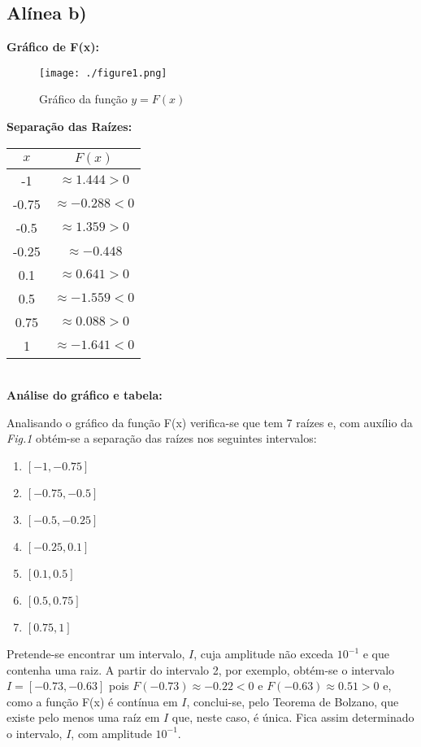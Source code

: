 \documentclass{article}
\begin{document}
\subsection*{Alínea b)}
\textbf{Gráfico de F(x):}\\
\begin{minipage}{0.6\textwidth}
\begin{figure}[H]
\texttt{[image: ./figure1.png]}
\caption{Gráfico da função $y=F(x)$}
\end{figure}
\end{minipage}
\begin{minipage}{0.3\textwidth}
\textbf{Separação das Raízes:}\\[5mm]
\begin{tabular}{c|c}
    $ x $ & $F(x)$\\
    \hline
    -1  & $ \approx 1.444>0 $\\
    -0.75 & $\approx-0.288<0$\\
    -0.5 & $\approx1.359>0$\\
    -0.25 & $\approx-0.448$\\
    0.1 & $\approx0.641>0$\\
    0.5 & $\approx-1.559<0$ \\
    0.75 & $\approx0.088>0$\\
    1 & $\approx-1.641<0 $\\
\end{tabular}
\end{minipage}\\[5mm]
\textbf{Análise do gráfico e tabela:}\par
Analisando o gráfico da função F(x) verifica-se que tem 7 raízes e, com auxílio da \textit{Fig.1} obtém-se a separação das raízes nos seguintes intervalos:
  \begin{enumerate}
    \item $[-1,-0.75]$
    \item $[-0.75,-0.5]$
    \item $[-0.5,-0.25]$
    \item $[-0.25,0.1]$
    \item $[0.1,0.5]$
    \item $[0.5,0.75]$
    \item $[0.75,1]$
  \end{enumerate}\par
  Pretende-se encontrar um intervalo, $I$, cuja amplitude não exceda $10^{-1}$ e que contenha uma raiz. A partir do intervalo 2, por exemplo, obtém-se o intervalo $I= [-0.73,-0.63]$ pois $F(-0.73) \approx -0.22 <0 $ e $F(-0.63) \approx0.51>0$ e, como a função F(x) é contínua em $I$, conclui-se, pelo Teorema de Bolzano, que existe pelo menos uma raíz em $I$ que, neste caso, é única. Fica assim determinado o intervalo, $I$, com amplitude $10^{-1}$.\\[2mm]
\end{document}
